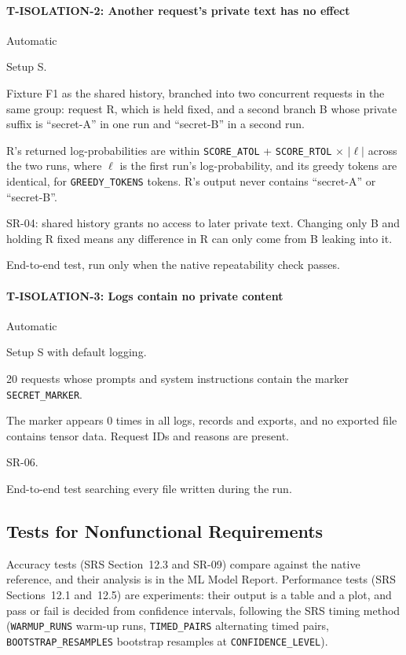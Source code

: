 \documentclass[12pt, titlepage]{article}
\newenvironment{testcase}[2]
  {\Needspace{8\baselineskip}\paragraph{#1: #2}\phantomsection\label{test:#1}\sloppy
   \begin{description}[style=sameline, leftmargin=3.6cm, labelwidth=3.4cm,
     font=\normalfont\bfseries, itemsep=2pt, topsep=2pt]}
  {\end{description}}
\newcommand{\cst}[1]{\texttt{#1}}
\begin{document}
\begin{testcase}{T-ISOLATION-2}{Another request's private text has no
effect}
\item[Control] Automatic
\item[Initial state] Setup S.
\item[Input] Fixture F1 as the shared history, branched into two
concurrent requests in the same group: request R, which is held fixed, and
a second branch B whose private suffix is ``secret-A'' in one run and
``secret-B'' in a second run.
\item[Output] R's returned log-probabilities are within \cst{SCORE\_ATOL}
+ \cst{SCORE\_RTOL}$\,\times\,\lvert\ell\rvert$ across the two runs,
where $\ell$ is the first run's log-probability, and its greedy tokens are identical,
for \cst{GREEDY\_TOKENS} tokens. R's output never contains ``secret-A'' or
``secret-B''.
\item[Derivation] SR-04: shared history grants no access to later private
text. Changing only B and holding R fixed means any difference in R can
only come from B leaking into it.
\item[How performed] End-to-end test, run only when the native repeatability
check passes.
\end{testcase}

\begin{testcase}{T-ISOLATION-3}{Logs contain no private content}
\item[Control] Automatic
\item[Initial state] Setup S with default logging.
\item[Input] 20 requests whose prompts and system instructions contain the
marker \cst{SECRET\_MARKER}.
\item[Output] The marker appears 0 times in all logs, records and exports,
and no exported file contains tensor data. Request IDs and reasons are
present.
\item[Derivation] SR-06.
\item[How performed] End-to-end test searching every file written during the
run.
\end{testcase}

\subsection{Tests for Nonfunctional Requirements}

Accuracy tests (SRS Section~12.3 and SR-09) compare against the native
reference, and their analysis is in the ML Model Report. Performance tests
(SRS Sections~12.1 and~12.5) are
experiments: their output is a table and a plot, and pass or fail is
decided from confidence intervals, following the SRS timing method
\citep[Section~12.1]{TandemSRS}
(\cst{WARMUP\_RUNS} warm-up runs, \cst{TIMED\_PAIRS} alternating timed
pairs, \cst{BOOTSTRAP\_RESAMPLES} bootstrap resamples at
\cst{CONFIDENCE\_LEVEL}).
\end{document}
